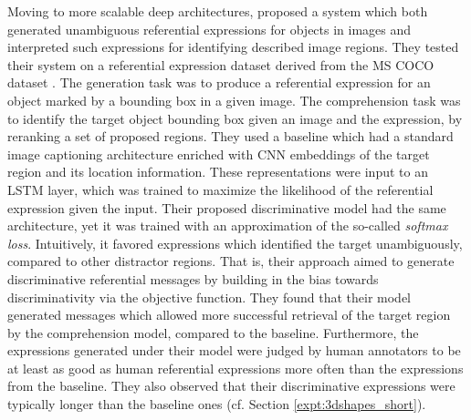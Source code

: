 Moving to more scalable deep architectures, \cite{mao2016generation} proposed a system which both generated unambiguous referential expressions for objects in images and interpreted such expressions for identifying described image regions. They tested their system on a referential expression dataset derived from the MS COCO dataset \parencite{chen2015microsoft}. %
The generation task was to produce a referential expression for an object marked by a bounding box in a given image. The comprehension task was to identify the target object bounding box given an image and the expression, by reranking a set of proposed regions.
They used a baseline which had a standard image captioning architecture \parencite[cf.][]{vinyals2015show} enriched with CNN embeddings of the target region and its location information. These representations were input to an LSTM layer, which was trained to maximize the likelihood of the referential expression given the input. Their proposed discriminative model had the same architecture, yet it was trained with an approximation of the so-called \textit{softmax loss}. Intuitively, it favored expressions which identified the target unambiguously, compared to other distractor regions. 
That is, their approach aimed to generate discriminative referential messages by building in the bias towards discriminativity via the objective function.  
They found that their model generated messages which allowed more successful retrieval of the target region by the comprehension model, compared to the baseline. Furthermore, the expressions generated under their model were judged by human annotators to be at least as good as human referential expressions more often than the expressions from the baseline. They also observed that their discriminative expressions were typically longer than the baseline ones (cf. Section \ref{expt:3dshapes_short}). 

